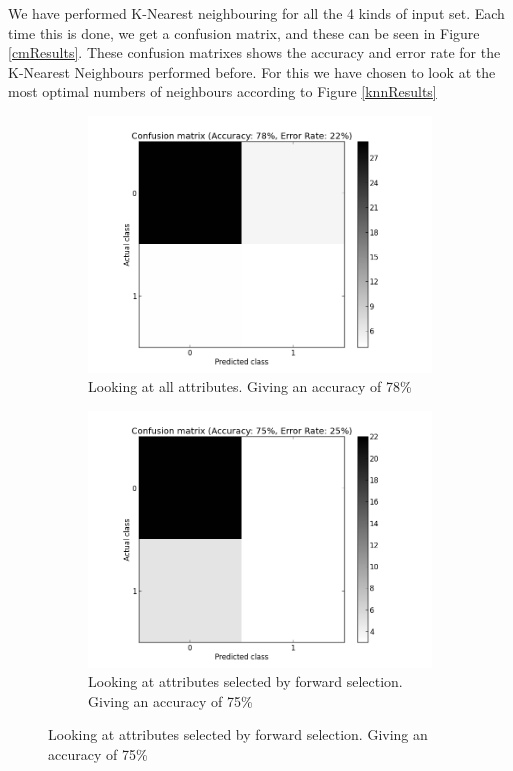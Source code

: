 We have performed K-Nearest neighbouring for all the 4 kinds of input set. Each time this is done, we get a confusion matrix, and these can be seen in Figure \ref{cmResults}. These confusion matrixes shows the accuracy and error rate for the K-Nearest Neighbours performed before. For this we have chosen to look at the most optimal numbers of neighbours according to Figure \ref{knnResults}

\begin{figure}[H]
	\begin{subfigure}[b]{0.5\textwidth}
	\includegraphics[scale=0.2]{pictures/cmX.png}
	\caption{Looking at all attributes. \newline Giving an accuracy of 78\% }
	\label{cmResultX}
	\end{subfigure}
	\begin{subfigure}[b]{0.5\textwidth}
	\includegraphics[scale=0.2]{pictures/cmXAD.png}	
	\caption{Looking at attributes selected by forward selection.  Giving an accuracy of 75\%}
	\label{cmResultXad}
	\end{subfigure}


\end{figure}
